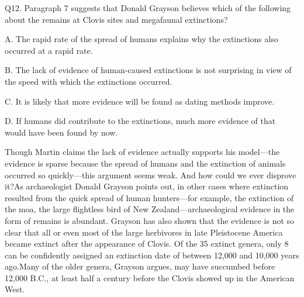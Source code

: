\begin{blk}
    \begin{qst}
        Q12.
        Paragraph 7 suggests that Donald Grayson believes which of the following about the remains at Clovis sites and megafaunal extinctions?
    \end{qst}

    \begin{chc}
        A.
        The rapid rate of the spread of humans explains why the extinctions also occurred at a rapid rate.

        B.
        The lack of evidence of human-caused extinctions is not surprising in view of the speed with which the extinctions occurred.

        C.
        It is likely that more evidence will be found as dating methods improve.

        D.
        If humans did contribute to the extinctions, much more evidence of that would have been found by now.
    \end{chc}

    \begin{psgq}
        Though Martin claims the lack of evidence actually supports his model—the evidence is sparse because the spread of humans and the extinction of animals occurred so quickly—this argument seems weak. And how could we ever disprove it?As archaeologist Donald Grayson points out, in other cases where extinction resulted from the quick spread of human hunters—for example, the extinction of the moa, the large flightless bird of New Zealand—archaeological evidence in the form of remains is abundant. Grayson has also shown that the evidence is not so clear that all or even most of the large herbivores in late Pleistocene America became extinct after the appearance of Clovis. Of the 35 extinct genera, only 8 can be confidently assigned an extinction date of between 12,000 and 10,000 years ago.Many of the older genera, Grayson argues, may have succumbed before 12,000 B.C., at least half a century before the Clovis showed up in the American West.
    \end{psgq}


\end{blk}
